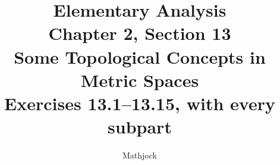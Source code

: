 
\title{\textbf{Elementary Analysis}\\[0.3em]
Chapter 2, Section 13\\[0.3em]
\large Some Topological Concepts in Metric Spaces\\
Exercises 13.1--13.15, with every subpart}
\author{Mathjock}
\date{}

\maketitle
\bookinfo
\tableofcontents
\clearpage
\setcounter{section}{12}



